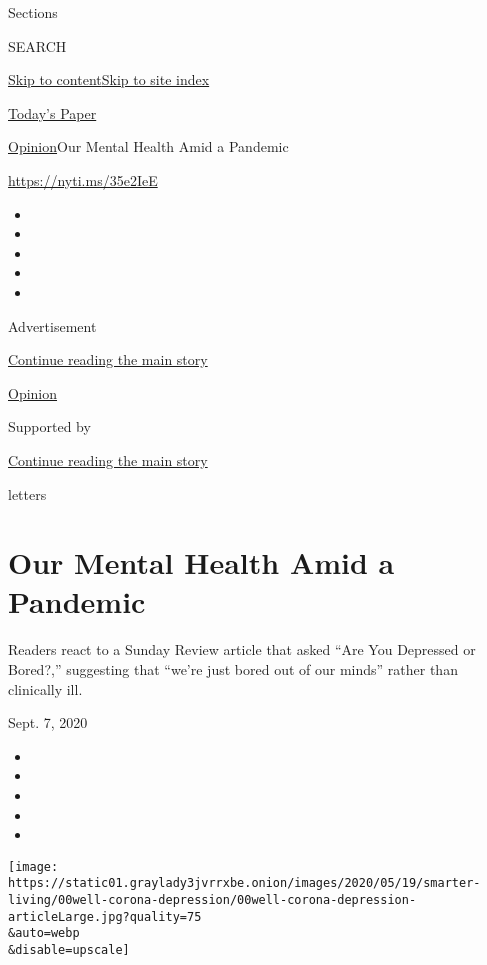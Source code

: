 Sections

SEARCH

\protect\hyperlink{site-content}{Skip to
content}\protect\hyperlink{site-index}{Skip to site index}

\href{https://myaccount.nytimes3xbfgragh.onion/auth/login?response_type=cookie\&client_id=vi}{}

\href{https://www.nytimes3xbfgragh.onion/section/todayspaper}{Today's
Paper}

\href{/section/opinion}{Opinion}\textbar{}Our Mental Health Amid a
Pandemic

\url{https://nyti.ms/35e2IeE}

\begin{itemize}
\item
\item
\item
\item
\item
\end{itemize}

Advertisement

\protect\hyperlink{after-top}{Continue reading the main story}

\href{/section/opinion}{Opinion}

Supported by

\protect\hyperlink{after-sponsor}{Continue reading the main story}

letters

\hypertarget{our-mental-health-amid-a-pandemic}{%
\section{Our Mental Health Amid a
Pandemic}\label{our-mental-health-amid-a-pandemic}}

Readers react to a Sunday Review article that asked ``Are You Depressed
or Bored?,'' suggesting that ``we're just bored out of our minds''
rather than clinically ill.

Sept. 7, 2020

\begin{itemize}
\item
\item
\item
\item
\item
\end{itemize}

\texttt{[image: https://static01.graylady3jvrrxbe.onion/images/2020/05/19/smarter-living/00well-corona-depression/00well-corona-depression-articleLarge.jpg?quality=75\\\&auto=webp\\\&disable=upscale]}

